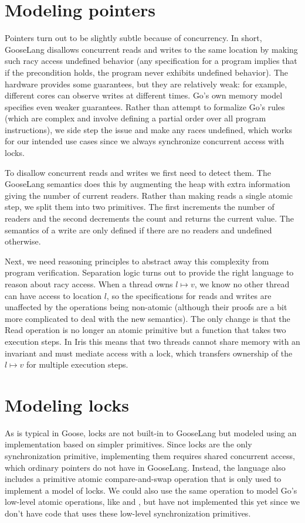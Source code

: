 \section{Modeling pointers}

Pointers turn out to be slightly subtle because of concurrency. In
short, GooseLang disallows concurrent reads and writes to the same
location by making such racy access undefined behavior (any
specification for a program implies that if the precondition holds, the
program never exhibits undefined behavior). The hardware provides some
guarantees, but they are relatively weak: for example, different cores
can observe writes at different times. Go's own memory model specifies
even weaker guarantees. Rather than attempt to formalize Go's rules
(which are complex and involve defining a partial order over all program
instructions), we side step the issue and make any races undefined,
which works for our intended use cases since we always synchronize
concurrent access with locks.

To disallow concurrent reads and writes we first need to detect them.
The GooseLang semantics does this by augmenting the heap with extra
information giving the number of current readers. Rather than making
reads a single atomic step, we split them into two primitives. The first
increments the number of readers and the second decrements the count and
returns the current value. The semantics of a write are only defined if
there are no readers and undefined otherwise.

Next, we need reasoning principles to abstract away this complexity from
program verification. Separation logic turns out to provide the right
language to reason about racy access. When a thread owns
$l \mapsto v$, we know no other thread can have access to location
$l$, so the specifications for reads and writes are unaffected by the
operations being non-atomic (although their proofs are a bit more
complicated to deal with the new semantics). The only change is that the
Read operation is no longer an atomic primitive but a function that
takes two execution steps. In Iris this means that two threads cannot
share memory with an invariant and must mediate access with a lock,
which transfers ownership of the $l \mapsto v$ for multiple execution
steps.

\section{Modeling locks}

As is typical in Goose, locks are not built-in to GooseLang but modeled
using an implementation based on simpler primitives. Since locks are the
only synchronization primitive, implementing them requires shared
concurrent access, which ordinary pointers do not have in GooseLang.
Instead, the language also includes a primitive atomic compare-and-swap
operation that is only used to implement a model of locks. We could also
use the same operation to model Go's low-level atomic operations, like
 and , but
have not implemented this yet since we don't have code that uses these
low-level synchronization primitives.

